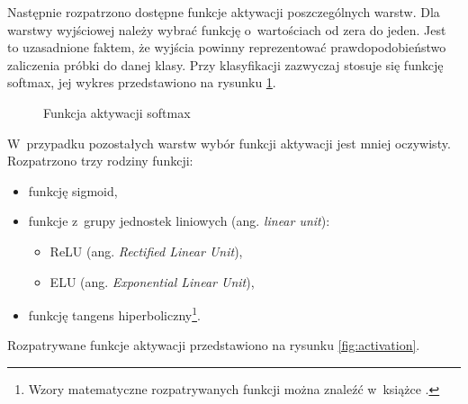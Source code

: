 Następnie rozpatrzono dostępne funkcje aktywacji poszczególnych warstw.
Dla warstwy wyjściowej należy wybrać funkcję o~wartościach od zera do jeden.
Jest to uzasadnione faktem, że wyjścia powinny reprezentować prawdopodobieństwo
zaliczenia próbki do danej klasy.
Przy klasyfikacji zazwyczaj stosuje się funkcję softmax, jej wykres
przedstawiono na rysunku \ref{fig:softmax}.%
\begin{figure}[tb]
    \centering
    \caption{Funkcja aktywacji softmax}
    \label{fig:softmax}
\end{figure}
W~przypadku pozostałych warstw wybór funkcji aktywacji jest mniej oczywisty.
Rozpatrzono trzy rodziny funkcji:
\begin{itemize}
    \item funkcję sigmoid,
    \item funkcje z~grupy jednostek liniowych (ang. \textit{linear unit}):
          \begin{itemize}
              \item ReLU (ang. \textit{Rectified Linear Unit}),
              \item ELU (ang. \textit{Exponential Linear Unit}),
          \end{itemize}
    \item funkcję tangens hiperboliczny\footnote{%
    Wzory matematyczne rozpatrywanych funkcji można znaleźć w~książce
    \cite[str. 273]{geron_ml}.
    }.%
\end{itemize}
Rozpatrywane funkcje aktywacji przedstawiono na rysunku \ref{fig:activation}.~%
